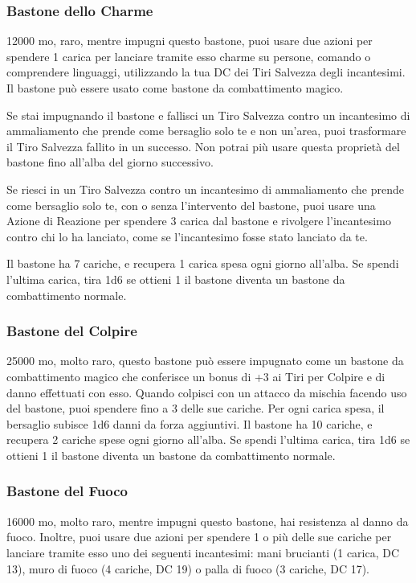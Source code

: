 \begin{multicols}{2}
	\subsubsection*{Bastone dello Charme}
	12000 mo, raro, mentre impugni questo bastone, puoi usare due azioni per spendere 1 carica per lanciare tramite esso charme su persone, comando o comprendere linguaggi, utilizzando la tua DC dei Tiri Salvezza degli incantesimi. Il bastone può essere usato come bastone da combattimento magico.

	Se stai impugnando il bastone e fallisci un Tiro Salvezza contro un incantesimo di ammaliamento che prende come bersaglio solo te e non un'area, puoi trasformare il Tiro Salvezza fallito in un successo. Non potrai più usare questa proprietà del bastone fino all'alba del giorno successivo.

	Se riesci in un Tiro Salvezza contro un incantesimo di ammaliamento che prende come bersaglio solo te, con o senza l'intervento del bastone, puoi usare una Azione di Reazione per spendere 3 carica dal bastone e rivolgere l'incantesimo contro chi lo ha lanciato, come se l'incantesimo fosse stato lanciato da te.

	Il bastone ha 7 cariche, e recupera 1 carica spesa ogni giorno all'alba. Se spendi l'ultima carica, tira 1d6 se ottieni 1 il bastone diventa un bastone da combattimento normale.

	\subsubsection*{Bastone del Colpire}
	25000 mo, molto raro, questo bastone può essere impugnato come un bastone da combattimento magico che conferisce un bonus di +3 ai Tiri per Colpire e di danno effettuati con esso. Quando colpisci con un attacco da mischia facendo uso del bastone, puoi spendere fino a 3 delle sue cariche. Per ogni carica spesa, il bersaglio subisce 1d6 danni da forza aggiuntivi. Il bastone ha 10 cariche, e recupera 2 cariche spese ogni giorno all'alba. Se spendi l'ultima carica, tira 1d6 se ottieni 1 il bastone diventa un bastone da combattimento normale.

	\subsubsection*{Bastone del Fuoco}
	16000 mo, molto raro, mentre impugni questo bastone, hai resistenza al danno da fuoco.
	Inoltre, puoi usare due azioni per spendere 1 o più delle sue cariche per lanciare tramite esso uno dei seguenti incantesimi: mani brucianti (1 carica, DC 13), muro di fuoco (4 cariche, DC 19) o palla di fuoco (3 cariche, DC 17).


\end{multicols}
